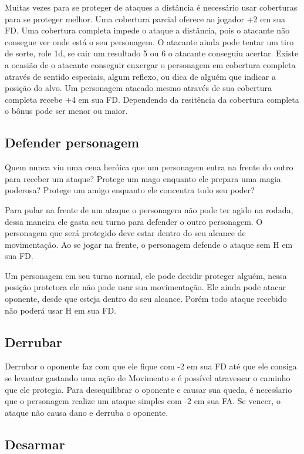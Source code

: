Muitas vezes para se proteger de ataques a distância é necessário usar coberturas para se proteger melhor. Uma cobertura parcial oferece ao jogador +2 em sua FD. Uma cobertura completa impede o ataque a distância, pois o atacante não consegue ver onde está o seu personagem. O atacante ainda pode tentar um tiro de sorte, role 1d, se cair um resultado 5 ou 6 o atacante conseguiu acertar. Existe a ocasião de o atacante conseguir enxergar o personagem em cobertura completa através de sentido especiais, algum reflexo, ou dica de alguém que indicar a posição do alvo. Um personagem atacado mesmo através de sua cobertura completa recebe +4 em sua FD. Dependendo da resitência da cobertura completa o bônus pode ser menor ou maior.

\subsection{Defender personagem}

Quem nunca viu uma cena heróica que um personagem entra na frente do outro para receber um ataque? Protege um mago enquanto ele prepara uma magia poderosa? Protege um amigo enquanto ele concentra todo seu poder?

Para pular na frente de um ataque o personagem não pode ter agido na rodada, dessa maneira ele gasta seu turno para defender o outro personagem. O personagem que será protegido deve estar dentro do seu alcance de movimentação. Ao se jogar na frente, o personagem defende o ataque sem H em sua FD.

Um personagem em seu turno normal, ele pode decidir proteger alguém, nessa posição protetora ele não pode usar sua movimentação. Ele ainda pode atacar oponente, desde que esteja dentro do seu alcance. Porém todo ataque recebido não poderá usar H em sua FD. 

\subsection{Derrubar}

Derrubar o oponente faz com que ele fique com -2 em sua FD até que ele consiga se levantar gastando uma ação de Movimento e é possível atravessar o caminho que ele protegia. Para desequilibrar o oponente e causar sua queda, é necesśario que o personagem realize um ataque simples com -2 em sua FA. Se vencer, o ataque não causa dano e derruba o oponente. 

\subsection{Desarmar}

